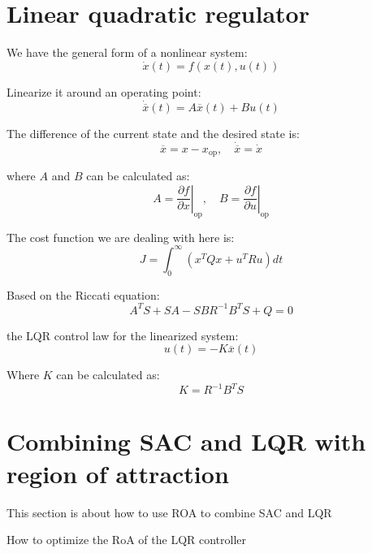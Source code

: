 \section{Linear quadratic regulator}
We have the general form of a nonlinear system:
\begin{equation}
    \dot{x}(t) = f(x(t), u(t))
\end{equation}

Linearize it around an operating point:
\begin{equation}
    \dot{\overline{x}}(t) = A \overline{x}(t) + B u(t)
\end{equation}

The difference of the current state and the desired state is:
\begin{equation}
    \overline{x} = x - x_{\text{op}}, \quad \dot{\overline{x}} = \dot{x}
\end{equation}

where \(A\) and \(B\) can be calculated as:
\begin{equation}
    A = \left.\frac{\partial f}{\partial x}\right|_{\text{op}}, \quad B = \left.\frac{\partial f}{\partial u}\right|_{\text{op}}
\end{equation}

The cost function we are dealing with here is:
\begin{equation}
J = \int_0^{\infty} \left( x^T Q x + u^T R u \right) dt
\end{equation}

Based on the Riccati equation:
\begin{equation}
    A^T S + SA - SBR^{-1}B^T S + Q = 0
\end{equation}

 the LQR control law for the linearized system:
\begin{equation}
    u(t) = -K\overline{x}(t)
\end{equation}

Where \(K\) can be calculated as:
\begin{equation}
    K = R^{-1}B^T S
\end{equation}

\section{Combining SAC and LQR with region of attraction}
This section is about how to use ROA to combine SAC and LQR

How to optimize the RoA of the LQR controller

